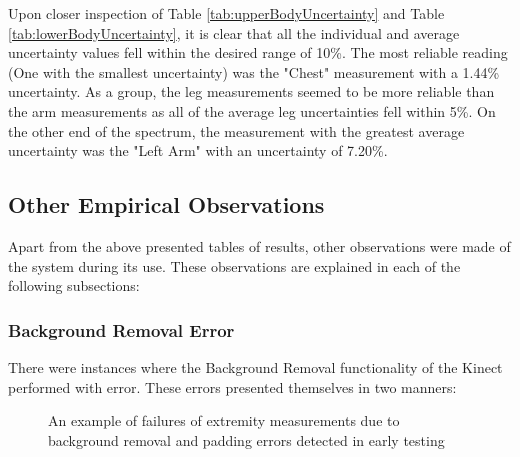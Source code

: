 Upon closer inspection of Table \ref{tab:upperBodyUncertainty} and Table \ref{tab:lowerBodyUncertainty}, it is clear that all the individual and average uncertainty values fell within the desired range of 10\%. The most reliable reading (One with the smallest uncertainty) was the "Chest" measurement with a 1.44\% uncertainty. As a group, the leg measurements seemed to be more reliable than the arm measurements as all of the average leg uncertainties fell within 5\%. On the other end of the spectrum, the measurement with the greatest average uncertainty was the "Left Arm" with an uncertainty of 7.20\%.

\subsection{Other Empirical Observations} \label{empiricalObservations}

Apart from the above presented tables of results, other observations were made of the system during its use. These observations are explained in each of the following subsections:

\subsubsection{Background Removal Error} \label{backgroundRemovalError}
There were instances where the Background Removal functionality of the Kinect performed with error. These errors presented themselves in two manners:

\begin{figure}[ht]
	\centering
	{%
		\setlength{\fboxsep}{0pt}%
		\setlength{\fboxrule}{0.5pt}%
		}
	\caption{An example of failures of extremity measurements due to background removal and padding errors detected in early testing}
	\label{fig:errorExample}
\end{figure}

